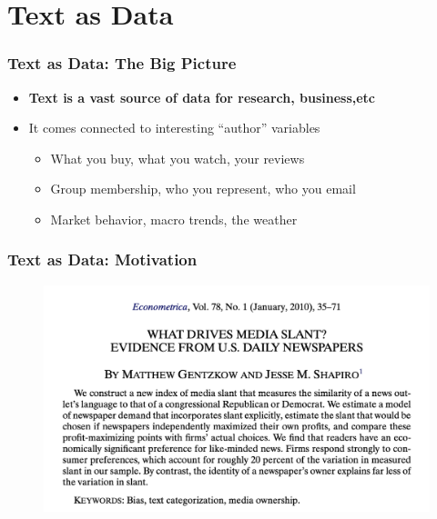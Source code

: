 \documentclass[
  shownotes,
  xcolor={svgnames},
  hyperref={colorlinks,citecolor=DarkBlue,linkcolor=DarkRed,urlcolor=DarkBlue}
  , aspectratio=169]{beamer}
\newcommand{\theme}{\color{andesred}}
\begin{document}
\section{Text as Data}
\begin{frame}[fragile]
\frametitle{Text as Data: The Big Picture}

\begin{itemize}


\item {\bf \theme Text is a vast source of data for research, business,etc }
\medskip
\item It comes connected to interesting ``author'' variables 
\medskip
  \begin{itemize}
  \item What you buy, what you watch, your reviews
  \medskip
  \item Group membership, who you represent, who you email
  \medskip
  \item Market behavior, macro trends, the weather
  \end{itemize}

 

\end{itemize}

\end{frame}
\begin{frame}[fragile]
\frametitle{Text as Data: Motivation}


  \begin{figure}[H] \centering
            \captionsetup{justification=centering}
              \includegraphics[scale=0.6]{figures/gentzgow_shapiro}
              
 \end{figure}

\end{frame}
\end{document}

